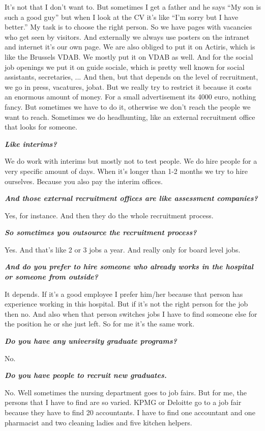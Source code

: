 \documentclass[a4paper,fleqn,11pt,dvips,titlepage]{article}
\newcommand{\question}[1]{\textbf{\textit{#1}}}
\numberwithin{figure}{section}
\numberwithin{equation}{section}
\begin{document}
It’s not that I don’t want to. But sometimes I get a father and he says “My son is such a good guy” but when I look at the CV it’s like “I’m sorry but I have better.” My task is to choose the right person. 
So we have pages with vacancies who get seen by visitors. And externally we always use posters on the intranet and internet it’s our own page. We are also obliged to put it on Actiris, which is like the Brussels VDAB. We mostly put it on VDAB as well. And for the social job openings we put it on guide sociale, which is pretty well known for social assistants, secretaries, ... And then, but that depends on the level of recruitment, we go in press, vacatures, jobat. But we really try to restrict it because it costs an enormous amount of money. For a small advertisement its 4000 euro, nothing fancy. But sometimes we have to do it, otherwise we don’t reach the people we want to reach. Sometimes we do headhunting, like an external recruitment office that looks for someone. 

\question{Like interims?}

We do work with interims but mostly not to test people. We do hire people for a very specific amount of days. When it’s longer than 1-2 months we try to hire ourselves. Because you also pay the interim offices. 

\question{And those external recruitment offices are like assessment companies?}

Yes, for instance. And then they do the whole recruitment process. 

\question{So sometimes you outsource the recruitment process?}

Yes. And that’s like 2 or 3 jobs a year. And really only for board level jobs. 

\question{And do you prefer to hire someone who already works in the hospital or someone from outside?}

It depends. If it’s a good employee I prefer him/her because that person has experience working in this hospital. But if it’s not the right person for the job then no. And also when that person switches jobs I have to find someone else for the position he or she just left. So for me it’s the same work. 

\question{Do you have any university graduate programs?}

No. 


\question{Do you have people to recruit new graduates.}

No. Well sometimes the nursing department goes to job fairs. But for me, the persons that I have to find are so varied. KPMG or Deloitte go to a job fair because they have to find 20 accountants. I have to find one accountant and one pharmacist and two cleaning ladies and five kitchen helpers. 
\end{document}

